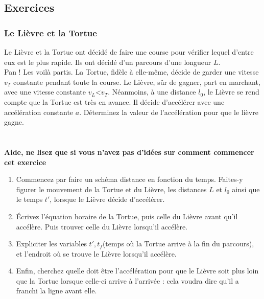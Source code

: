 \documentclass[a4paper,10pt,twoside]{article}
\begin{document}
\subsection{Exercices}
\subsubsection{Le Lièvre et la Tortue}
    Le Lièvre et la Tortue ont décidé de faire une course pour vérifier lequel d'entre eux est le plus rapide. Ils ont décidé d'un parcours d'une longueur $L$. \\
    Pan ! Les voilà partis. La Tortue, fidèle à elle-même, décide de garder une vitesse $v_T$ constante pendant toute la course. Le Lièvre, sûr de gagner, part en marchant, avec une vitesse constante $v_L$<$v_T$. Néanmoins, à une distance $l_0$, le Lièvre se rend compte que la Tortue est très en avance. Il décide d'accélérer avec une accélération constante $a$. Déterminez la valeur de l'accélération pour que le lièvre gagne. 
    \\ 
    \\
    \\
    \textbf{Aide, ne lisez que si vous n'avez pas d'idées sur comment commencer cet exercice}\\
    \begin{enumerate}
    \item Commencez par faire un schéma distance en fonction du temps. Faites-y figurer le mouvement de la Tortue et du Lièvre, les distances $L$ et $l_0$ ainsi que le temps $t'$, lorsque le Lièvre décide d'accélérer.
    \item Écrivez l'équation horaire de la Tortue, puis celle du Lièvre avant qu'il accélère. Puis trouver celle du Lièvre lorsqu'il accélère. 
    \item Expliciter les variables $t', t_f$(temps où la Tortue arrive à la fin du parcours), et l'endroit où se trouve le Lièvre lorsqu'il accélère. 
    \item Enfin, cherchez quelle doit être l'accélération pour que le Lièvre soit plus loin que la Tortue lorsque celle-ci arrive à l'arrivée : cela voudra dire qu'il a franchi la ligne avant elle.
\end{enumerate}
\end{document}
